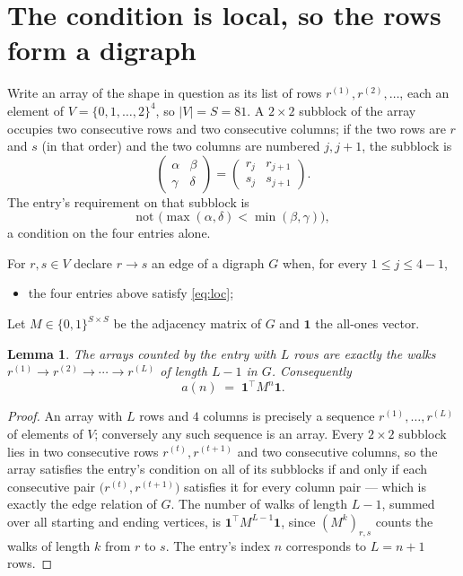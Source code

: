 \documentclass[11pt,a4paper]{article}
\theoremstyle{plain}
\newtheorem{lemma}[theorem]{Lemma}
\theoremstyle{definition}
\begin{document}
\section{The condition is local, so the rows form a digraph}

Write an array of the shape in question as its list of rows
$r^{(1)},r^{(2)},\dots$, each an element of
$V=\{0,1,\dots,2\}^{4}$, so $|V|=S=81$. A $2\times2$ subblock of the array
occupies two consecutive rows and two consecutive columns; if the two rows are $r$
and $s$ (in that order) and the two columns are numbered $j,j+1$,
the subblock is
\[
\begin{pmatrix}\alpha&\beta\\\gamma&\delta\end{pmatrix}=\begin{pmatrix}r_j&r_{j+1}\\s_j&s_{j+1}\end{pmatrix}.
\]
The entry's requirement on that subblock is
\begin{equation}\label{eq:loc}
\text{not }\bigl(\max(\alpha,\delta)<\min(\beta,\gamma)\bigr),
\end{equation}
a condition on the four entries alone.

For $r,s\in V$ declare $r\to s$ an edge of a digraph $G$ when, for every
$1\le j\le 4-1$,
\begin{itemize}
\item the four entries above satisfy \eqref{eq:loc};

\end{itemize}
Let $M\in\{0,1\}^{S\times S}$ be the adjacency matrix of $G$ and $\mathbf{1}$ the
all-ones vector.

\begin{lemma}\label{lem:walk}
The arrays counted by the entry with $L$ rows are exactly the walks
$r^{(1)}\to r^{(2)}\to\cdots\to r^{(L)}$ of length $L-1$ in $G$. Consequently
\[
a(n)\;=\;\mathbf{1}^{\!\top}M^{n}\mathbf{1} .
\]
\end{lemma}

\begin{proof}
An array with $L$ rows and $4$ columns is precisely a sequence
$r^{(1)},\dots,r^{(L)}$ of elements of $V$; conversely any such sequence is an array.
Every $2\times2$ subblock lies in two consecutive rows $r^{(t)},r^{(t+1)}$ and two
consecutive columns, so the array satisfies the entry's condition on all of its subblocks
if and only if each consecutive pair $\bigl(r^{(t)},r^{(t+1)}\bigr)$ satisfies it for
every column pair --- which is exactly the edge relation of $G$. The number of walks of
length $L-1$, summed over all starting and ending vertices, is
$\mathbf{1}^{\!\top}M^{L-1}\mathbf{1}$, since $(M^{k})_{r,s}$ counts the walks of
length $k$ from $r$ to $s$. The entry's index $n$ corresponds to $L=n+1$ rows.
\end{proof}
\end{document}
